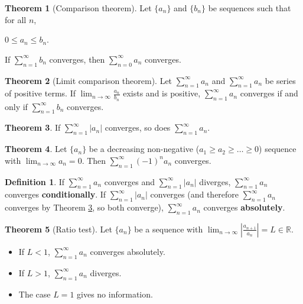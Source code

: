 \documentclass{article}
\theoremstyle{definition}
\newtheorem{definition}{Definition}[section]
\newtheorem{theorem}{Theorem}[section]
\begin{document}
\begin{theorem}[Comparison theorem]
Let $\{a_n\}$ and $\{b_n\}$ be sequences such that for all $n$,

\begin{center}
$0 \leq a_n \leq b_n$.
\end{center}

If $\sum\limits_{n=1}^\infty b_n$ converges, then $\sum\limits_{n=0}^\infty a_n$ converges.
\end{theorem}

\begin{theorem}[Limit comparison theorem]
Let $\sum\limits_{n=1}^\infty a_n$ and $\sum\limits_{n=1}^\infty a_n$ be series of positive terms. If $\lim_{n \to \infty} \frac{a_n}{b_n}$ exists and is positive, $\sum\limits_{n=1}^\infty a_n$ converges if and only if $\sum\limits_{n=1}^\infty b_n$ converges.
\end{theorem}

\begin{theorem} \label{absolute-convergence-theorem}
If $\sum\limits_{n=1}^\infty |a_n|$ converges, so does $\sum\limits_{n=1}^\infty a_n$.
\end{theorem}

\begin{theorem}
Let $\{a_n\}$ be a decreasing non-negative ($ a_1 \geq a_2 \geq \ldots \geq 0$) sequence with $\lim_{n \to \infty} a_n = 0$. Then $\sum\limits_{n=1}^\infty (-1)^n a_n$ converges.
\end{theorem}

\begin{definition}
If  $\sum\limits_{n=1}^\infty a_n$ converges and  $\sum\limits_{n=1}^\infty |a_n|$ diverges,  $\sum\limits_{n=1}^\infty a_n$ converges \textbf{conditionally}. If  $\sum\limits_{n=1}^\infty |a_n|$ converges (and therefore  $\sum\limits_{n=1}^\infty a_n$ converges by Theorem \ref{absolute-convergence-theorem}, so both converge), $\sum\limits_{n=1}^\infty a_n$ converges \textbf{absolutely}.
\end{definition}

\begin{theorem}[Ratio test]
Let $\{a_n\}$ be a sequence with $\lim_{n \to \infty} |\frac{a_{n+1}}{a_n}| = L \in \mathbb{R}$.

\begin{itemize}
\item If $L < 1$, $\sum\limits_{n=1}^\infty a_n$ converges absolutely.
\item If $L > 1$, $\sum\limits_{n=1}^\infty a_n$ diverges.
\item The case $L = 1$ gives no information.
\end{itemize}
\end{theorem}
\end{document}
